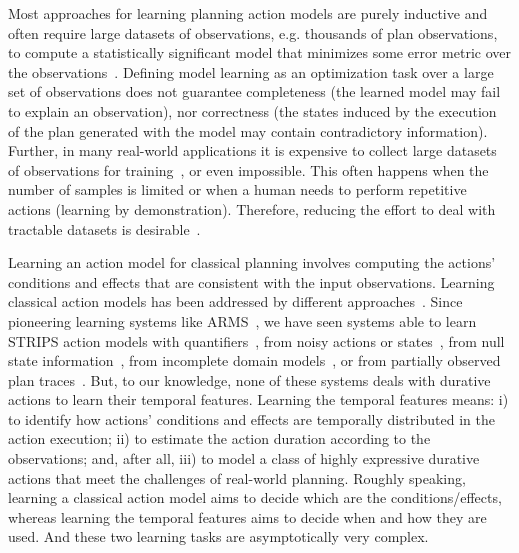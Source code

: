 \documentclass[10pt,journal,compsoc]{IEEEtran}
\begin{document}
Most approaches for learning planning action models are purely inductive and often require large datasets of observations, e.g. thousands of plan observations, to compute a statistically significant model that minimizes some error metric over the observations~\cite{kuvcera2018louga,MouraoZPS12,yang2007learning,ZhuoYHL10,zhuo2013action}. Defining model learning as an optimization task over a large set of observations does not guarantee completeness (the learned model may fail to explain an observation), nor correctness (the states induced by the execution of the plan generated with the model may contain contradictory information). 
Further, in many real-world applications it is expensive to collect large datasets of observations for training~\cite{Jialin2010}, or even impossible.
This often happens when the number of samples is limited or when a human needs to perform repetitive actions (learning by demonstration).
Therefore, reducing the effort to deal with tractable datasets is desirable~\cite{Jialin2010}.


Learning an action model for classical planning involves computing the actions' conditions and effects that are consistent with the input observations.
Learning classical action models has been addressed by different approaches~\cite{arora2018review}. Since pioneering learning systems like ARMS~\cite{yang2007learning}, we have seen systems able to learn STRIPS action models with quantifiers~\cite{AmirC08,ZhuoYHL10}, from noisy actions or states~\cite{MouraoZPS12,zhuo2013action}, from null state information~\cite{cresswell2013acquiring}, from incomplete domain models~\cite{ZhuoK17,ZhuoNK13}, or from partially observed plan traces~\cite{Zhuo2014}. But, to our knowledge, none of these systems deals with durative actions to learn their temporal features. 
Learning the temporal features means: i) to identify how actions' conditions and effects are temporally distributed in the action execution; ii) to estimate the action duration according to the observations; and, after all, iii) to model a class of highly expressive durative actions that meet the challenges of real-world planning.
Roughly speaking, learning a classical action model aims to decide which are the conditions/effects, whereas learning the temporal features aims to decide when and how they are used. And these two learning tasks are asymptotically very complex.
\end{document}
